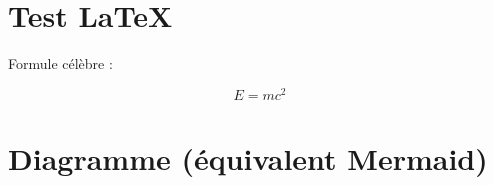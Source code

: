 \documentclass{article}
\begin{document}
\section*{Test LaTeX}

Formule célèbre :

\[
E = mc^2
\]

\section*{Diagramme (équivalent Mermaid)}

 
\end{document}
